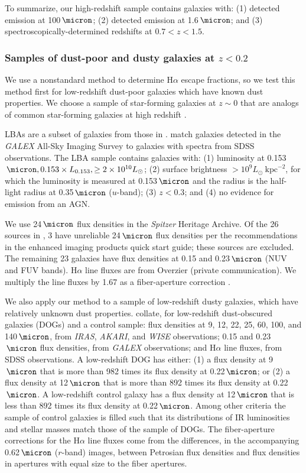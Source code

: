 \documentclass[preprint]{aastex}
\begin{document}
To summarize, our high-redshift sample contains galaxies with: (1) detected
emission at 100$\,\micron$; (2) detected emission at 1.6$\,\micron$; and (3)
spectroscopically-determined redshifts at $0.7 < z < 1.5$.

\subsubsection{Samples of dust-poor and dusty galaxies at $z < 0.2$}

We use a nonstandard method to determine H$\alpha$ escape fractions, so we test this
method first for low-redshift dust-poor galaxies which have known dust
properties.  We choose a sample of star-forming galaxies at $z \sim 0$ that are
analogs of common star-forming galaxies at high redshift
\citep[LBAs;][]{overzier09,overzier11}.

LBAs are a subset of galaxies from those in \citet{heckman05}.
\citet{heckman05} match galaxies detected in the \emph{GALEX} All-Sky Imaging
Survey to galaxies with spectra from SDSS observations.  The LBA sample contains
galaxies with: (1) luminosity at 0.153$\,\micron, 0.153 \times L_{0.153},
\ge 2 \times 10^{10} L_{\odot}$; (2) surface brightness $> 10^{9} L_{\odot}~
\mathrm{kpc}^{-2}$, for which the luminosity is measured at 0.153$\,\micron$
and the radius is the half-light radius at 0.35$\,\micron$ ($u$-band);
(3) $z < 0.3$; and (4) no evidence for emission from an AGN.

We use 24$\,\micron$ flux densities in the \emph{Spitzer} Heritage Archive.  Of
the 26 sources in \citet{overzier11}, 3 have unreliable 24$\,\micron$ flux
densities per the recommendations in the enhanced imaging products quick start
guide; these sources are excluded.  The remaining 23 galaxies have flux
densities at
0.15 and 0.23$\,\micron$ (NUV and FUV bands).
H$\alpha$ line
fluxes are from Overzier (private communication).  We
multiply the line fluxes by 1.67 as a fiber-aperture correction
\citep{overzier09}.

We also apply our method to a sample of low-redshift dusty galaxies, which have
relatively unknown dust properties.  \citet{hwang13} collate, for low-redshift
dust-obscured galaxies (DOGs) and a control sample: flux densities at
9, 12, 22, 25, 60, 100, and 140$\,\micron$, from \emph{IRAS}, \emph{AKARI}, and
\emph{WISE} observations; 0.15 and 0.23$\,\micron$ flux densities, from
\emph{GALEX} observations; and H$\alpha$ line fluxes, from SDSS observations.
A low-redshift DOG has either: (1) a flux density at 9$\,\micron$ that is more
than 982 times its flux density at 0.22$\,\micron$; or (2) a flux density at
12$\,\micron$ that is more than 892 times its flux density at 0.22$\,\micron$.
A low-redshift control galaxy has a flux density at
12$\,\micron$ that is less than 892 times its flux density at 0.22$\,\micron$.
Among other criteria the sample of control galaxies is filled such that its
distributions of IR luminosities and stellar masses match those of the sample
of DOGs.
The fiber-aperture corrections for the H$\alpha$ line fluxes come from the
differences, in the accompanying 0.62$\,\micron$ ($r$-band) images, between
Petrosian flux
densities and flux densities in apertures with equal size to the fiber
apertures.
\end{document}
